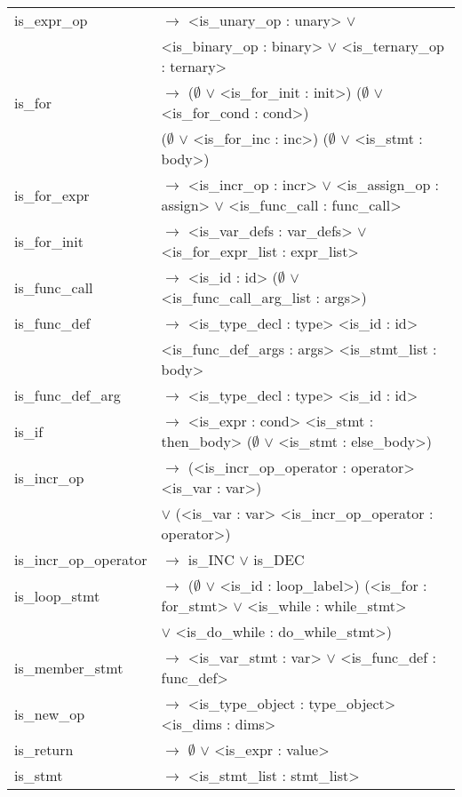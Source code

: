 \documentclass[a4paper]{article}
\begin{document}
\begin{tabular}{ll}
	is\_expr\_op							& $\to$ <is\_unary\_op : unary> $\vee$ \\ %
											& <is\_binary\_op : binary> $\vee$ <is\_ternary\_op : ternary> \\
	is\_for									& $\to$ ($\emptyset$ $\vee$ <is\_for\_init : init>) ($\emptyset$ $\vee$ <is\_for\_cond : cond>) \\ %
											& ($\emptyset$ $\vee$ <is\_for\_inc : inc>) ($\emptyset$ $\vee$ <is\_stmt : body>) \\
	is\_for\_expr							& $\to$ <is\_incr\_op : incr> $\vee$ <is\_assign\_op : assign> $\vee$ <is\_func\_call : func\_call> \\
	is\_for\_init							& $\to$ <is\_var\_defs : var\_defs> $\vee$ <is\_for\_expr\_list : expr\_list> \\
	is\_func\_call							& $\to$ <is\_id : id> ($\emptyset$ $\vee$ <is\_func\_call\_arg\_list : args>) \\
	is\_func\_def							& $\to$ <is\_type\_decl : type> <is\_id : id> \\ %
											& <is\_func\_def\_args : args> <is\_stmt\_list : body> \\
	is\_func\_def\_arg						& $\to$ <is\_type\_decl : type> <is\_id : id> \\
	is\_if									& $\to$ <is\_expr : cond> <is\_stmt : then\_body> ($\emptyset$ $\vee$ <is\_stmt : else\_body>) \\
	is\_incr\_op							& $\to$ (<is\_incr\_op\_operator : operator> <is\_var : var>) \\
											& $\vee$ (<is\_var : var> <is\_incr\_op\_operator : operator>) \\
	is\_incr\_op\_operator					& $\to$ is\_INC $\vee$ is\_DEC \\
	is\_loop\_stmt							& $\to$ ($\emptyset$ $\vee$ <is\_id : loop\_label>) (<is\_for : for\_stmt> $\vee$ <is\_while : while\_stmt> \\ 
											& $\vee$ <is\_do\_while : do\_while\_stmt>) \\
	is\_member\_stmt						& $\to$ <is\_var\_stmt : var> $\vee$ <is\_func\_def : func\_def> \\
	is\_new\_op								& $\to$ <is\_type\_object : type\_object> <is\_dims : dims> \\
	is\_return								& $\to$ $\emptyset$ $\vee$ <is\_expr : value> \\
	is\_stmt								& $\to$ <is\_stmt\_list : stmt\_list> \\

\end{tabular}
\end{document}
